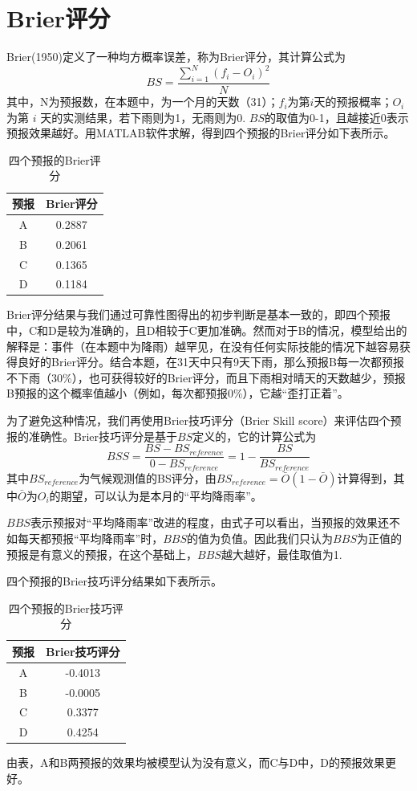 \documentclass[a4paper,12pt,onecolumn,twoside]{article}
\begin{document}
\section{Brier评分}
Brier(1950)定义了一种均方概率误差，称为Brier评分，其计算公式为\cite{brier1950verification}
\begin{equation}
	BS=\frac{\sum_{i=1}^{N}(f_{i}-O_{i})^{2}}{N}
\end{equation}
其中，N为预报数，在本题中，为一个月的天数（31）；$f_{i}$为第$i$天的预报概率；$O_{i}$为第 $i$ 天的实测结果，若下雨则为1，无雨则为0. $BS$的取值为0-1，且越接近0表示预报效果越好。用MATLAB软件求解，得到四个预报的Brier评分如下表所示。
\begin{table}[H]
	\centering
	\caption{四个预报的Brier评分}
	\begin{tabular}{cc} 
		\hline
		预报 & Brier评分  \\ 
		\hline
		A  & 0.2887   \\
		B  & 0.2061   \\
		C  & 0.1365   \\
		D  & 0.1184   \\
		\hline
	\end{tabular}
\end{table}
Brier评分结果与我们通过可靠性图得出的初步判断是基本一致的，即四个预报中，C和D是较为准确的，且D相较于C更加准确。然而对于B的情况，模型给出的解释是：事件（在本题中为降雨）越罕见，在没有任何实际技能的情况下越容易获得良好的Brier评分。结合本题，在31天中只有9天下雨，那么预报B每一次都预报不下雨（30\%），也可获得较好的Brier评分，而且下雨相对晴天的天数越少，预报B预报的这个概率值越小（例如，每次都预报0\%），它越“歪打正着”。\par
为了避免这种情况，我们再使用Brier技巧评分（Brier Skill score）来评估四个预报的准确性。Brier技巧评分是基于$BS$定义的，它的计算公式为
\begin{equation}
	BSS=\frac{BS-BS_{reference}}{0-BS_{reference}}=1-\frac{BS}{BS_{reference}}
\end{equation}
其中$BS_{reference}$为气候观测值的BS评分，由$BS_{reference}=\bar{O}(1-\bar{O})$计算得到，其中$\bar{O}$为$O_{i}$的期望，可以认为是本月的“平均降雨率”。\par
$BBS$表示预报对“平均降雨率”改进的程度，由式子可以看出，当预报的效果还不如每天都预报“平均降雨率”时，$BBS$的值为负值。因此我们只认为$BBS$为正值的预报是有意义的预报，在这个基础上，$BBS$越大越好，最佳取值为1.\par
四个预报的Brier技巧评分结果如下表所示。
\begin{table}[H]
	\centering
	\caption{四个预报的Brier技巧评分}
	\begin{tabular}{cc} 
		\hline
		预报 & Brier技巧评分  \\ 
		\hline
		A  & -0.4013    \\
		B  & -0.0005    \\
		C  & 0.3377     \\
		D  & 0.4254     \\
		\hline
	\end{tabular}
\end{table}
由表，A和B两预报的效果均被模型认为没有意义，而C与D中，D的预报效果更好。
\end{document}
